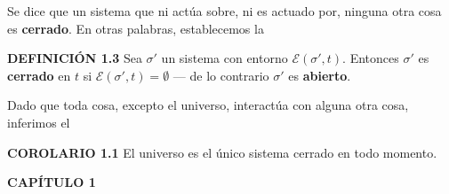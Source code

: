 {Se dice que un sistema que ni actúa sobre, ni es actuado por, ninguna otra cosa es \textbf{cerrado}. En otras palabras, establecemos la

\textbf{DEFINICIÓN 1.3} Sea $\sigma'$ un sistema con entorno $\mathcal{E}(\sigma', t)$. Entonces $\sigma'$ es \textbf{cerrado} en $t$ si $\mathcal{E}(\sigma', t) = \emptyset$ — de lo contrario $\sigma'$ es \textbf{abierto}.

Dado que toda cosa, excepto el universo, interactúa con alguna otra cosa, inferimos el

\textbf{COROLARIO 1.1} El universo es el único sistema cerrado en todo momento.
}

\newpage

\fancyhf{}
\fancyhead[l]{\thepage} 
\begin{center}
{\fontsize{13}{16}\selectfont \textbf{CAPÍTULO 1 }}
\end{center}
\vspace{0.5cm}


